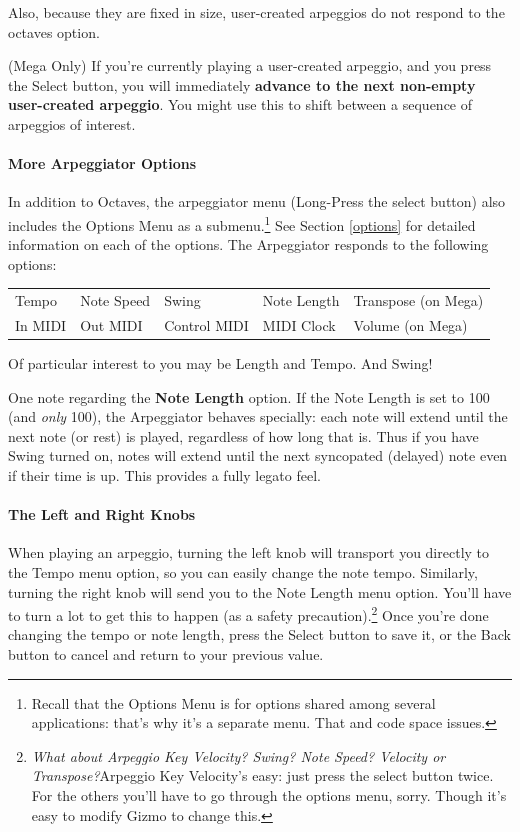 \documentclass{article}
\begin{document}
Also, because they are fixed in size, user-created arpeggios do not respond to the octaves option.

(Mega Only) If you're currently playing a user-created arpeggio, and you press the Select button, you will immediately {\bf advance to the next non-empty user-created arpeggio}.  You might use this to shift between a sequence of arpeggios of interest.

\paragraph{More Arpeggiator Options}

In addition to Octaves, the arpeggiator menu (Long-Press the select button) also includes the Options Menu as a submenu.\footnote{Recall that the Options Menu is for options shared among several applications: that's why it's a separate menu.  That and code space issues.}  See Section \ref{options} for detailed information on each of the options.  The Arpeggiator responds to the following options:

\vspace{0.75em}
\begin{tabular}{lllll}
Tempo& Note Speed& Swing & Note Length&Transpose (on Mega)\\
In MIDI& Out MIDI&Control MIDI&MIDI Clock&Volume (on Mega)\\
\end{tabular}

\vspace{0.75em}
Of particular interest to you may be Length and Tempo.  And Swing!

One note regarding the {\bf Note Length} option.  If the Note Length is set to 100 (and {\it only} 100), the Arpeggiator behaves specially: each note will extend until the next note (or rest) is played, regardless of how long that is.  Thus if you have Swing turned on, notes will extend until the next syncopated (delayed) note even if their time is up. This provides a fully legato feel.


\paragraph{The Left and Right Knobs}  When playing an arpeggio, turning the left knob will transport you directly to the Tempo menu option, so you can easily change the note tempo.  Similarly, turning the right knob will send you to the Note Length menu option.  You'll have to turn a lot to get this to happen (as a safety precaution).\footnote{{\it What about Arpeggio Key Velocity?  Swing?  Note Speed? Velocity or Transpose?}\qquad Arpeggio Key Velocity's easy: just press the select button twice.  For the others you'll have to go through the options menu, sorry.  Though it's easy to modify Gizmo to change this.}  Once you're done changing the tempo or note length, press the Select button to save it, or the Back button to cancel and return to your previous value.
\end{document}
